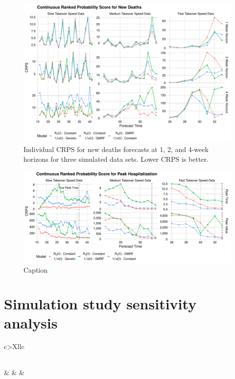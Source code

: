 \begin{figure}
    \centering
    \includegraphics[width=1.0\columnwidth]{simulated_crps_comparison_data_new_deaths_plot}
    \caption{Individual CRPS for new deaths forecasts at 1, 2, and 4-week horizons for three simulated data sets. Lower CRPS is better.}
    \label{ch_5:fig:simulated_crps_comparison_data_new_deaths_plot}
\end{figure}

\begin{figure}
    \centering
    \includegraphics[width=1.0\columnwidth]{simulated_peak_crps_plot}
    \caption{Caption}
    \label{ch_5:fig:simulated_peak_crps_plot}
\end{figure}

\section{Simulation study sensitivity analysis}
\label{ch_5:sec:sim_sensitivity}

\begin{xltabular}{\columnwidth}{c>{\RaggedRight}Xllc}
    \label{ch_5:tbl:simulation_prior_sensitivity_table}\\
\caption{TKTK}\\[\belowcaptionskip]
	 &  &  &  \\ \hline
\end{xltabular}

